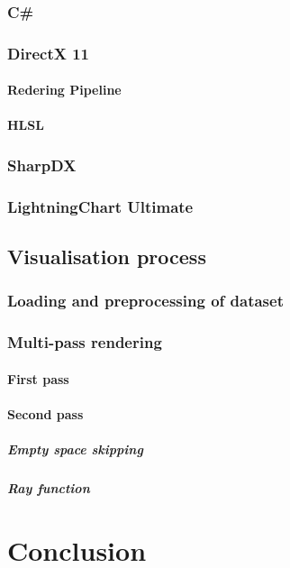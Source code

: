 \documentclass[english, 11pt]{report}
\begin{document}
\subsection{C\#}
\subsection{DirectX 11}
\subsubsection{Redering Pipeline}
\subsubsection{HLSL}
\subsection{SharpDX}
\subsection{LightningChart Ultimate}
\section{Visualisation process}
\subsection{Loading and preprocessing of dataset}
\subsection{Multi-pass rendering}
\subsubsection{First pass}
\subsubsection{Second pass}
\paragraph{Empty space skipping}
\paragraph{Ray function}

\chapter{Conclusion}
\end{document}
